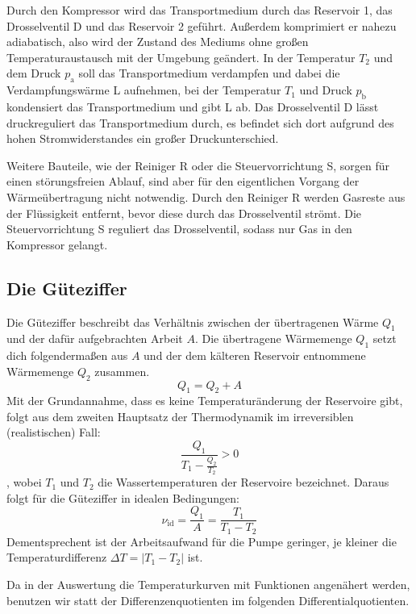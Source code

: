 Durch den Kompressor wird das Transportmedium durch das Reservoir 1, das Drosselventil D und das Reservoir 2 geführt.
Außerdem komprimiert er nahezu adiabatisch, also wird der Zustand des Mediums ohne großen Temperaturaustausch mit der Umgebung geändert.
In der Temperatur $T_2$ und  dem Druck $p_{\text{a}}$ soll das Transportmedium verdampfen und dabei die Verdampfungswärme L aufnehmen, 
bei der Temperatur $T_1$ und Druck $p_{\text{b}}$ kondensiert das Transportmedium und gibt L ab.
Das Drosselventil D lässt druckreguliert das Transportmedium durch, es befindet sich dort aufgrund des hohen Stromwiderstandes ein großer Druckunterschied.

Weitere Bauteile, wie der Reiniger R oder die Steuervorrichtung S, sorgen für einen störungsfreien Ablauf, sind aber für den eigentlichen Vorgang der Wärmeübertragung nicht notwendig.
Durch den Reiniger R werden Gasreste aus der Flüssigkeit entfernt, bevor diese durch das Drosselventil strömt.
Die Steuervorrichtung S reguliert das Drosselventil, sodass nur Gas in den Kompressor gelangt. 

\subsection{Die Güteziffer} \label{subsec:gueteziffer}
Die Güteziffer beschreibt das Verhältnis zwischen der übertragenen Wärme $Q_1$ und der dafür aufgebrachten Arbeit $A$.
Die übertragene Wärmemenge $Q_1$ setzt dich folgendermaßen aus $A$ und der dem kälteren Reservoir entnommene Wärmemenge $Q_2$ zusammen.
\begin{equation}
    Q_1 = Q_2 + A 
\end{equation}
Mit der Grundannahme, dass es keine Temperaturänderung der Reservoire gibt, folgt aus dem zweiten Hauptsatz der Thermodynamik im irreversiblen (realistischen) Fall:
\begin{equation}
    \frac{Q_1}{T_1 - \frac{Q_2}{T_2}} > 0
\end{equation}
, wobei $T_1$ und $T_2$ die Wassertemperaturen der Reservoire bezeichnet.
Daraus folgt für die Güteziffer in idealen Bedingungen:
\begin{equation}\label{eqn:idguete}
    \nu_{\text{id}} = \frac{Q_1}{A} = \frac{T_1}{T_1 - T_2}
\end{equation}
Dementsprechent ist der Arbeitsaufwand für die Pumpe geringer, je kleiner die Temperaturdifferenz $\Delta T = |T_1 - T_2|$ ist.

Da in der Auswertung die Temperaturkurven mit Funktionen angenähert werden, benutzen wir statt der Differenzenquotienten im folgenden Differentialquotienten.

